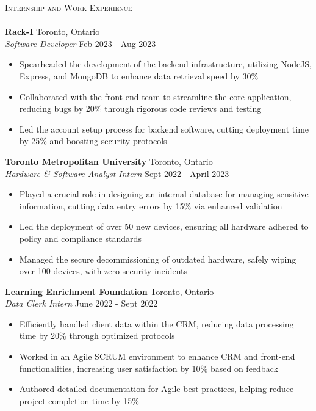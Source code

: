 \documentclass[a4paper]{article}
\newcommand{\lineunder} {
    \vspace*{-8pt} \\
    \hspace*{-18pt} \hrulefill \\
}
\newcommand{\header} [1] {
    {\hspace*{-18pt}\vspace*{6pt} \textsc{#1}}
    \vspace*{-6pt} \lineunder
}
\begin{document}
\header{Internship and Work Experience}
\textbf{Rack-I} \hfill Toronto, Ontario\\
\textit{Software Developer} \hfill Feb 2023 - Aug 2023\\
\vspace{-1mm}
\begin{itemize} \itemsep 1pt
    \item Spearheaded the development of the backend infrastructure, utilizing NodeJS, Express, and MongoDB to enhance data retrieval speed by 30\%
    \item Collaborated with the front-end team to streamline the core application, reducing bugs by 20\% through rigorous code reviews and testing
    \item Led the account setup process for backend software, cutting deployment time by 25\% and boosting security protocols
\end{itemize}
\textbf{Toronto Metropolitan University} \hfill Toronto, Ontario\\
\textit{Hardware \& Software Analyst Intern} \hfill Sept 2022 - April 2023\\
\vspace{-1mm}
\begin{itemize} \itemsep 1pt
    \item Played a crucial role in designing an internal database for managing sensitive information, cutting data entry errors by 15\% via enhanced validation
    \item Led the deployment of over 50 new devices, ensuring all hardware adhered to policy and compliance standards
    \item Managed the secure decommissioning of outdated hardware, safely wiping over 100 devices, with zero security incidents
\end{itemize}
\textbf{Learning Enrichment Foundation} \hfill Toronto, Ontario\\
\textit{Data Clerk Intern} \hfill June 2022 - Sept 2022\\
\vspace{-1mm}
\begin{itemize} \itemsep 1pt
    \item Efficiently handled client data within the CRM, reducing data processing time by 20\% through optimized protocols
    \item Worked in an Agile SCRUM environment to enhance CRM and front-end functionalities, increasing user satisfaction by 10\% based on feedback
    \item Authored detailed documentation for Agile best practices, helping reduce project completion time by 15\%
\end{itemize}
\vspace{4mm}
\end{document}
